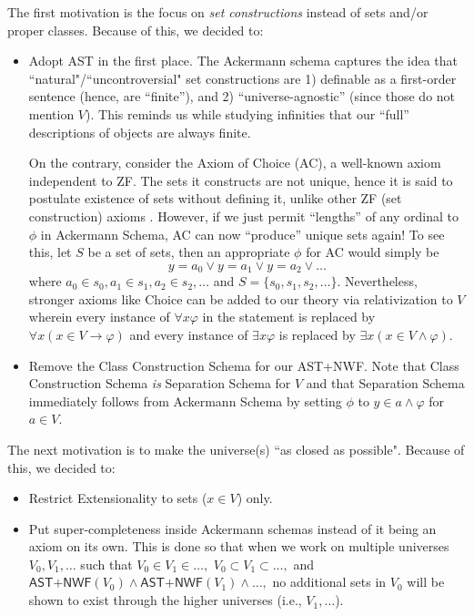 \documentclass{article}
\begin{document}
The first motivation is the focus on \textit{set constructions} instead of sets and/or proper classes. Because of this, we decided to:
\begin{itemize}
\item Adopt AST in the first place. The Ackermann schema captures the idea that ``natural"/``uncontroversial" set constructions are 1) definable as a first-order sentence (hence, are ``finite''), and 2) ``universe-agnostic'' (since those do not mention $V$). This reminds us while studying infinities that our ``full'' descriptions of objects are always finite.

On the contrary, consider the Axiom of Choice (AC), a well-known axiom independent to ZF. The sets it constructs are not unique, hence it is said to postulate existence of sets without defining it, unlike other ZF (set construction) axioms \cite[Chapter 5]{jech}. However, if we just permit ``lengths'' of any ordinal to $\phi$ in Ackermann Schema, AC can now ``produce'' unique sets again! To see this, let $S$ be a set of sets, then an appropriate $\phi$ for AC would simply be $$y = a_0 \vee y = a_1 \vee y = a_2 \vee \ldots$$ where $a_0 \in s_0, a_1 \in s_1, a_2 \in s_2, \ldots$ and $S=\{s_0, s_1, s_2, \ldots\}$. Nevertheless, stronger axioms like Choice can be added to our theory via relativization to $V$ wherein every instance of $\forall x \varphi$ in the statement is replaced by $\forall x (x \in V \rightarrow \varphi)$ and every instance of $\exists x \varphi$ is replaced by $\exists x (x \in V \wedge \varphi)$.
\item Remove the Class Construction Schema for our \textsf{AST+NWF}. Note that Class Construction Schema \textit{is} Separation Schema for $V$ and that Separation Schema immediately follows from Ackermann Schema by setting $\phi$ to $y \in a \wedge \varphi$ for $a\in V$.
\end{itemize}

The next motivation is to make the universe(s) ``as closed as possible". Because of this, we decided to:
\begin{itemize}
\item Restrict Extensionality to sets ($x \in V$) only.
\item Put super-completeness inside Ackermann schemas instead of it being an axiom on its own. This is done so that when we work on multiple universes $V_0, V_1, \ldots$ such that $V_0 \in V_1 \in \ldots,$ $V_0 \subset V_1 \subset \ldots,$ and $\textsf{AST+NWF}(V_0) \wedge \textsf{AST+NWF}(V_1) \wedge\ldots,$ no additional sets in $V_0$ will be shown to exist through the higher universes (i.e., $V_1, \ldots$).
\end{itemize}
\end{document}
